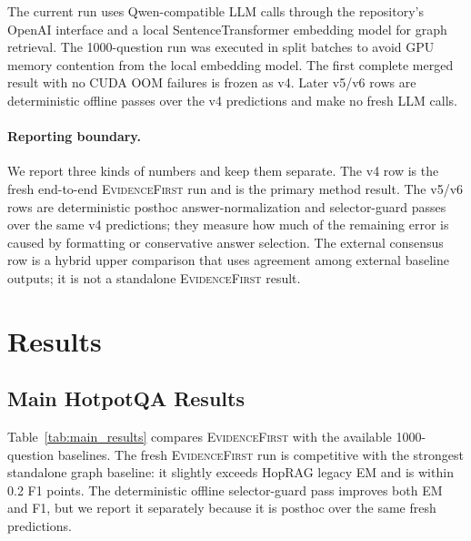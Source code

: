 \documentclass[runningheads]{llncs}
\newcommand{\sys}{\textsc{EvidenceFirst}\xspace}
\begin{document}
The current run uses Qwen-compatible LLM calls through the repository's OpenAI
interface and a local SentenceTransformer embedding model for graph retrieval.
The 1000-question run was executed in split batches to avoid GPU memory
contention from the local embedding model. The first complete merged result
with no CUDA OOM failures is frozen as v4. Later v5/v6 rows are deterministic
offline passes over the v4 predictions and make no fresh LLM calls.

\paragraph{Reporting boundary.}
We report three kinds of numbers and keep them separate. The v4 row is the
fresh end-to-end \sys run and is the primary method result. The v5/v6 rows are
deterministic posthoc answer-normalization and selector-guard passes over the
same v4 predictions; they measure how much of the remaining error is caused by
formatting or conservative answer selection. The external consensus row is a
hybrid upper comparison that uses agreement among external baseline outputs;
it is not a standalone \sys result.

\section{Results}
\label{sec:results}

\subsection{Main HotpotQA Results}

Table~\ref{tab:main_results} compares \sys with the available 1000-question
baselines. The fresh \sys run is competitive with the strongest standalone
graph baseline: it slightly exceeds HopRAG legacy EM and is within 0.2 F1
points. The deterministic offline selector-guard pass improves both EM and F1,
but we report it separately because it is posthoc over the same fresh
predictions.
\end{document}
